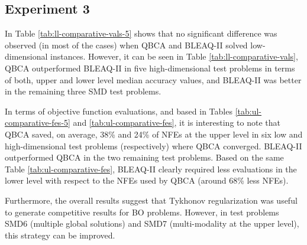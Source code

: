 \documentclass[conference]{IEEEtran}
\theoremstyle{definition}
\begin{document}
\subsection{Experiment 3}
In Table \ref{tab:ll-comparative-vals-5} shows that no significant difference was observed (in most of the cases) when QBCA and BLEAQ-II solved low-dimensional instances. However, it can be seen in Table \ref{tab:ll-comparative-vals}, QBCA outperformed BLEAQ-II
in five high-dimensional test problems in terms of both, upper and lower level median accuracy
values, and BLEAQ-II was better in the remaining three SMD test problems. 

In terms of objective function evaluations, and based in Tables \ref{tab:ul-comparative-fes-5} and \ref{tab:ul-comparative-fes},
it is interesting to note that QBCA saved, on average, 38\% and 24\% of NFEs at the upper
level in six low and high-dimensional test problems (respectively) where QBCA converged. BLEAQ-II outperformed QBCA in the two remaining test
problems. Based on the same Table \ref{tab:ul-comparative-fes}, BLEAQ-II clearly
required less evaluations in the lower level with respect to the NFEs used by
QBCA (around 68\% less NFEs). 

Furthermore, the overall results suggest that Tykhonov regularization was useful
to generate competitive results for BO problems. However, in test problems SMD6
(multiple global solutions) and SMD7 (multi-modality at the upper level), this
strategy can be improved.


\end{document}
